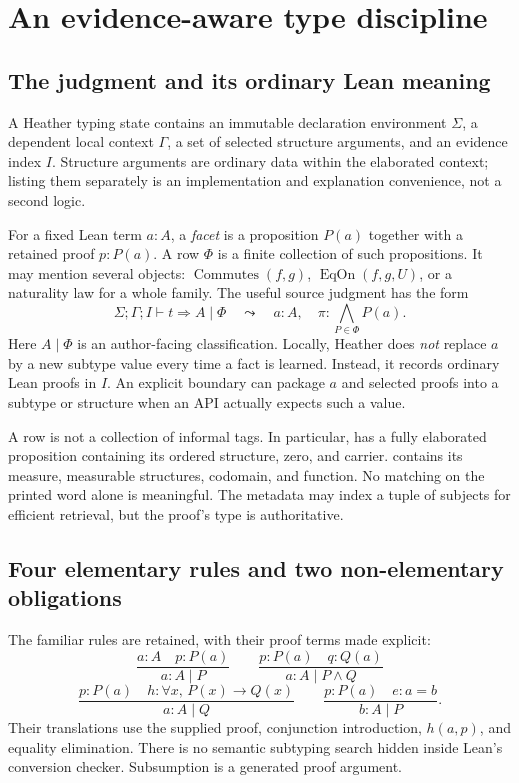 \documentclass[11pt,letterpaper]{article}
\newcommand{\code}[1]{\texttt{\detokenize{#1}}}
\newcommand{\typing}{\vdash}
\theoremstyle{definition}\newtheorem{definition}[theorem]{Definition}
\theoremstyle{remark}\newtheorem{remark}[theorem]{Remark}
\begin{document}
\section{An evidence-aware type discipline}\label{sec:types}

\subsection{The judgment and its ordinary Lean meaning}
A Heather typing state contains an immutable declaration environment $\Sigma$,
a dependent local context $\Gamma$, a set of selected structure arguments, and
an evidence index $I$. Structure arguments are ordinary data within the
elaborated context; listing them separately is an implementation and explanation
convenience, not a second logic.

For a fixed Lean term $a:A$, a \emph{facet} is a proposition $P(a)$ together
with a retained proof $p:P(a)$. A row $\Phi$ is a finite collection of such
propositions. It may mention several objects: $\operatorname{Commutes}(f,g)$,
$\operatorname{EqOn}(f,g,U)$, or a naturality law for a whole family. The useful
source judgment has the form
\[
 \Sigma;\Gamma;I\typing t \Rightarrow A\mid\Phi
 \quad\leadsto\quad a:A,\quad \pi:\bigwedge_{P\in\Phi}P(a).
\]
Here $A\mid\Phi$ is an author-facing classification. Locally, Heather does
\emph{not} replace $a$ by a new subtype value every time a fact is learned.
Instead, it records ordinary Lean proofs in $I$. An explicit boundary can
package $a$ and selected proofs into a subtype or structure when an API actually
expects such a value.

A row is not a collection of informal tags. In particular, \code{positive}
has a fully elaborated proposition containing its ordered structure, zero,
and carrier. \code{integrable} contains its measure, measurable structures,
codomain, and function. No matching on the printed word alone is meaningful.
The metadata may index a tuple of subjects for efficient retrieval, but the
proof's type is authoritative.

\subsection{Four elementary rules and two non-elementary obligations}
The familiar rules are retained, with their proof terms made explicit:
\[
\frac{a:A\quad p:P(a)}{a:A\mid P}
\qquad
\frac{p:P(a)\quad q:Q(a)}{a:A\mid P\wedge Q}
\]
\[
\frac{p:P(a)\quad h:\forall x,\,P(x)\to Q(x)}{a:A\mid Q}
\qquad
\frac{p:P(a)\quad e:a=b}{b:A\mid P}.
\]
Their translations use the supplied proof, conjunction introduction, $h(a,p)$,
and equality elimination. There is no semantic subtyping search hidden inside
Lean's conversion checker. Subsumption is a generated proof argument.
\end{document}
